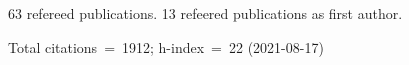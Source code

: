 63 refereed publications. 13 refeered publications as first author.

Total citations~=~1912; h-index~=~22 (2021-08-17)
